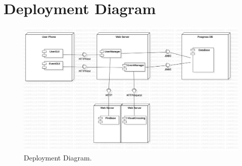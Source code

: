 \section{Deployment Diagram}
\begin{figure}[h!]
	\centering
	\includegraphics[width=0.8\linewidth]{diagrammi/DeploymentDiagram1.png}
	\caption{Deployment Diagram.}
	\label{fig:DeploymentDiagram}
\end{figure}